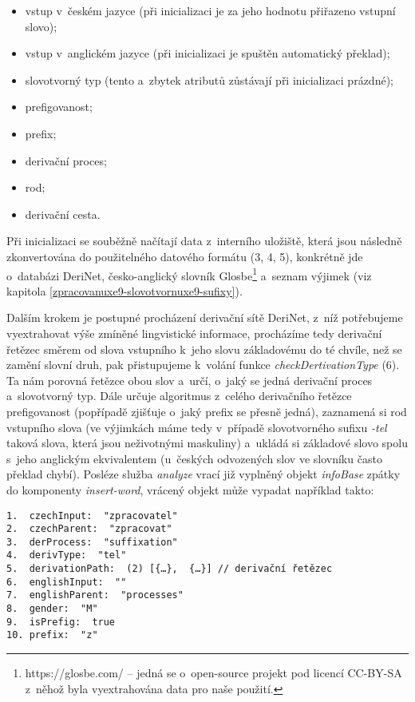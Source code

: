 \begin{itemize}
\tightlist
\item
  vstup v~českém jazyce (při inicializaci je za jeho hodnotu přiřazeno
  vstupní slovo);
\item
  vstup v~anglickém jazyce (při inicializaci je spuštěn automatický
  překlad);
\item
  slovotvorný typ (tento a~zbytek atributů zůstávají při inicializaci
  prázdné);
\item
  prefigovanost;
\item
  prefix;
\item
  derivační proces;
\item
  rod;
\item
  derivační cesta.
\end{itemize}

Při inicializaci se souběžně načítají data z~interního uložiště, která
jsou následně zkonvertována do použitelného datového formátu (3, 4, 5),
konkrétně jde o~databázi DeriNet, česko-anglický slovník
Glosbe\footnote{https://glosbe.com/ -- jedná se o~open-source projekt pod licencí CC-BY-SA z~něhož byla vyextrahována data pro naše použití.}
a~seznam výjimek (viz kapitola
\ref{zpracovanuxe9-slovotvornuxe9-sufixy}).

Dalším krokem je postupné procházení derivační sítě DeriNet, z~níž
potřebujeme vyextrahovat výše zmíněné lingvistické informace, procházíme
tedy derivační řetězec směrem od slova vstupního k~jeho slovu
základovému do té chvíle, než se zamění slovní druh, pak přistupujeme
k~volání funkce \emph{checkDertivationType} (6). Ta nám porovná řetězce
obou slov a~určí, o~jaký se jedná derivační proces a~slovotvorný typ.
Dále určuje algoritmus z~celého derivačního řetězce prefigovanost
(popřípadě zjišťuje o~jaký prefix se přesně jedná), zaznamená si rod
vstupního slova (ve výjimkách máme tedy v~případě slovotvorného sufixu
\emph{-tel} taková slova, která jsou neživotnými maskuliny) a~ukládá si
základové slovo spolu s~jeho anglickým ekvivalentem (u~českých
odvozených slov ve slovníku často překlad chybí). Posléze služba
\emph{analyze} vrací již vyplněný objekt \emph{infoBase} zpátky do
komponenty \emph{insert-word}, vrácený objekt může vypadat například
takto:

\begin{verbatim}
1.  czechInput:  "zpracovatel"
2.  czechParent:  "zpracovat"
3.  derProcess:  "suffixation"
4.  derivType:  "tel"
5.  derivationPath:  (2) [{…},  {…}] // derivační řetězec
6.  englishInput:  ""
7.  englishParent:  "processes"
8.  gender:  "M"
9.  isPrefig:  true
10. prefix:  "z"
\end{verbatim}

